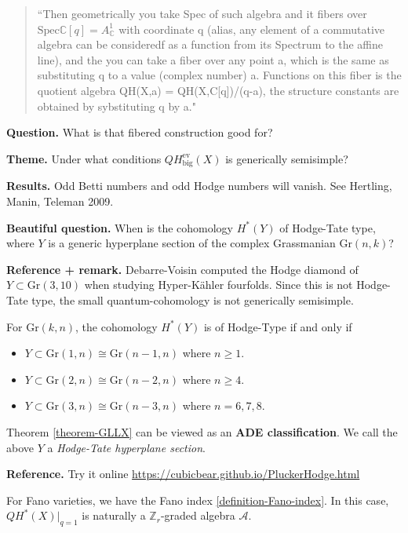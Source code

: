 \begin{quotation}
``Then geometrically you take Spec of such algebra and it
fibers over $\text{Spec} \mathbb{C}[q] = A^1_\mathbb{C}$ with coordinate q
(alias, any element of a commutative algebra can be consideredf as a function
from its Spectrum to the affine line), and the you can take a fiber over any
point a, which is the same as substituting q to a value (complex number) a.
Functions on this fiber is the quotient algebra QH(X,a) = QH(X,C[q])/(q-a), the
structure constants are obtained by sybstituting q by a."
\end{quotation}

{\bf Question.} What is that fibered construction good for?


{\bf Theme.} Under what conditions $QH^{\text{ev}}_{\text{big}}(X)$ is
generically semisimple?

{\bf Results.} Odd Betti numbers and odd Hodge numbers will vanish. See
Hertling, Manin, Teleman 2009.

{\bf Beautiful question.} When is the cohomology $H^*(Y)$ of Hodge-Tate type,
where $Y$ is a generic hyperplane section of the complex Grassmanian
$\text{Gr}(n,k)$?

{\bf Reference + remark.} Debarre-Voisin computed the Hodge diamond of $Y
\subset \text{Gr}(3,10)$ when studying Hyper-Kähler fourfolds. Since this is not
Hodge-Tate type, the small quantum-cohomology is not generically semisimple.

\begin{theorem}
\label{theorem-GLLX}
For $\text{Gr}(k,n)$, the cohomology $H^{*}(Y)$ is of Hodge-Type if and only if
\begin{itemize}
\item $Y \subset \text{Gr}(1,n)\cong \text{Gr}(n-1,n)$ where $n\geq 1$.
\item $Y \subset \text{Gr}(2,n) \cong \text{Gr}(n-2,n)$ where $n \geq 4$.
\item $Y \subset\text{Gr}(3,n) \cong\text{Gr}(n-3,n)$ where $n=6,7,8$.
\end{itemize}
\end{theorem}

Theorem \ref{theorem-GLLX} can be viewed as an {\bf ADE classification}. We call
the above $Y$ a {\it Hodge-Tate hyperplane section}.

{\bf Reference.} Try it online
\url{https://cubicbear.github.io/PluckerHodge.html} 

For Fano varieties, we have the Fano index \ref{definition-Fano-index}. In this
case, $QH^*(X)|_{q=1}$ is naturally a $\mathbb{Z}_r$-graded algebra
$\mathcal{A}$.





